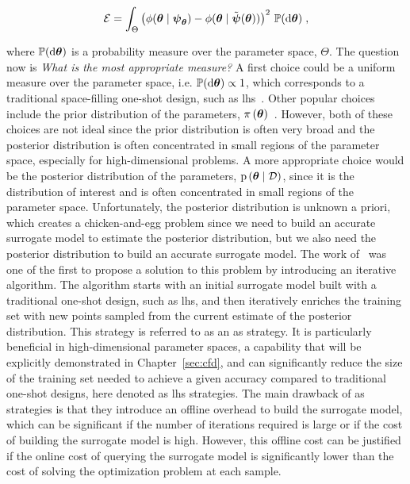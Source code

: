 \begin{equation}
  \mathcal{E} = \int_{\Theta}  \left(\phi(\boldsymbol{\theta} \mid \boldsymbol{\psi}_{\boldsymbol{\theta}}) - \phi(\boldsymbol{\theta} \mid \tilde{\boldsymbol{\psi}}(\boldsymbol{\theta})) \right)^2  \,\mathbb{P}(\text{d} \boldsymbol{\theta})\;,
\end{equation}

where $\mathbb{P}(\text{d} \boldsymbol{\theta})$ is a probability measure over the parameter space, $\Theta$. The question now is \textit{What is the most appropriate measure?} A first choice could be a uniform measure over the parameter space, i.e. $\mathbb{P}(\text{d} \boldsymbol{\theta}) \propto 1$, which corresponds to a traditional space-filling one-shot design, such as \gls{lhs}~\cite{Dutta2019}. Other popular choices include the prior distribution of the parameters, $\pi \left( \boldsymbol{\theta}\right)$~\cite{marzouk2007, marzouk2009}. However, both of these choices are not ideal since the prior distribution is often very broad and the posterior distribution is often concentrated in small regions of the parameter space, especially for high-dimensional problems. A more appropriate choice would be the posterior distribution of the parameters, $\mathrm{p} \left( \boldsymbol{\theta} \mid \mathcal{D} \right)$, since it is the distribution of interest and is often concentrated in small regions of the parameter space. Unfortunately, the posterior distribution is unknown a priori, which creates a chicken-and-egg problem since we need to build an accurate surrogate model to estimate the posterior distribution, but we also need the posterior distribution to build an accurate surrogate model. The work of~\cite{lucor2018} was one of the first to propose a solution to this problem by introducing an iterative algorithm. The algorithm starts with an initial surrogate model built with a traditional one-shot design, such as \gls{lhs}, and then iteratively enriches the training set with new points sampled from the current estimate of the posterior distribution. This strategy is referred to as an \gls{as} strategy. It is particularly beneficial in high-dimensional parameter spaces, a capability that will be explicitly demonstrated in Chapter~\ref{sec:cfd}, and can significantly reduce the size of the training set needed to achieve a given accuracy compared to traditional one-shot designs, here denoted as \gls{lhs} strategies. The main drawback of \gls{as} strategies is that they introduce an offline overhead to build the surrogate model, which can be significant if the number of iterations required is large or if the cost of building the surrogate model is high. However, this offline cost can be justified if the online cost of querying the surrogate model is significantly lower than the cost of solving the optimization problem at each sample.

